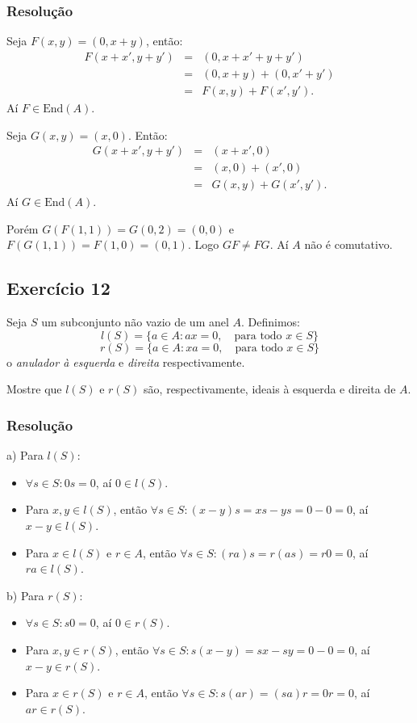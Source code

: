 \documentclass[10pt,a4paper]{article}
\begin{document}
\subsubsection*{Resolução}

Seja $F(x,y)=(0,x+y)$, então:
\[
\begin{array}{rcl}
F(x+x',y+y')&=&(0,x+x'+y+y')\\&=&(0,x+y)+(0,x'+y')\\&=&F(x,y)+F(x',y').
\end{array}
\]
Aí $F\in\mathrm{End}(A)$.

\medskip
\noindent
Seja $G(x,y)=(x,0)$. Então:
\[
\begin{array}{rcl}
G(x+x',y+y')&=&(x+x',0)\\&=&(x,0)+(x',0)\\&=&G(x,y)+G(x',y').
\end{array}
\]
Aí $G\in\mathrm{End}(A)$.

\medskip
\noindent
Porém $G(F(1,1))=G(0,2)=(0,0)$ e $F(G(1,1))=F(1,0)=(0,1)$. Logo $GF\neq FG$. Aí $A$ não é comutativo.

\subsection*{Exercício 12}
Seja $S$ um subconjunto não vazio de um anel $A$. Definimos:
\[
l(S)=\{a\in A:ax=0,\quad\text{para todo }x\in S\}
\]
\[
r(S)=\{a\in A:xa=0,\quad\text{para todo }x\in S\}
\]
o \textit{anulador à esquerda} e \textit{direita} respectivamente.

\medskip
\noindent
Mostre que $l(S)$ e $r(S)$ são, respectivamente, ideais à esquerda e direita de $A$.

\subsubsection*{Resolução}

a) Para $l(S)$:
\begin{itemize}
\item $\forall s\in S:0s=0$, aí $0\in l(S)$.
\item Para $x,y\in l(S)$, então $\forall s\in S:(x-y)s=xs-ys=0-0=0$, aí $x-y\in l(S)$.
\item Para $x\in l(S)$ e $r\in A$, então $\forall s\in S:(ra)s=r(as)=r0=0$, aí $ra\in l(S)$.
\end{itemize}

\medskip
\noindent
b) Para $r(S)$:
\begin{itemize}
\item $\forall s\in S:s0=0$, aí $0\in r(S)$.
\item Para $x,y\in r(S)$, então $\forall s\in S:s(x-y)=sx-sy=0-0=0$, aí $x-y\in r(S)$.
\item Para $x\in r(S)$ e $r\in A$, então $\forall s\in S:s(ar)=(sa)r=0r=0$, aí $ar\in r(S)$.
\end{itemize}
\end{document}
